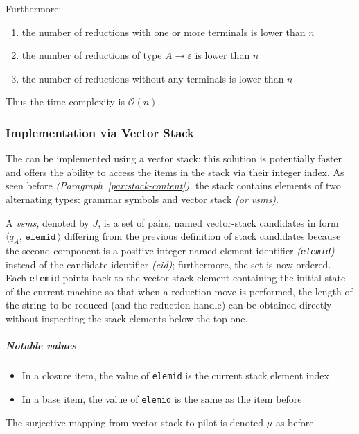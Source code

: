 \documentclass[english]{article}
\begin{document}
Furthermore:
\begin{enumerate}
  \item the number of reductions with one or more terminals is lower than \(n\)
  \item the number of reductions of type \(A \rightarrow \varepsilon\) is lower than \(n\)
  \item the number of reductions without any terminals is lower than \(n\)
\end{enumerate}

Thus the time complexity is \(\mathcal{O}(n)\).

\subsubsection{Implementation via Vector Stack}

The \PDA can be implemented using a vector stack: this solution is potentially faster and offers the ability to access the items in the stack via their integer index.
As seen before \textit{(Paragraph~\ref{par:stack-content})}, the stack contains elements of two alternating types: grammar symbols and vector stack \mstates \textit{(or vsms)}.

A \textit{vsms}, denoted by \(J\), is a set of pairs, named vector-stack candidates in form \(\langle q_A, \, \texttt{elemid} \, \rangle\) differing from the previous definition of stack candidates because the second component is a positive integer named element identifier \textit{(\texttt{elemid})} instead of the candidate identifier \textit{(cid)};
furthermore, the set is now ordered.
Each \texttt{elemid} points back to the vector-stack element containing the initial state of the current machine so that when a reduction move is performed, the length of the string to be reduced (and the reduction handle) can be obtained directly without inspecting the stack elements below the top one.

\subparagraph*{Notable values}

\begin{itemize}
  \item In a closure item, the value of \texttt{elemid} is the current stack element index
  \item In a base item, the value of \texttt{elemid} is the same as the item before
\end{itemize}

\bigskip
The surjective mapping from vector-stack \mstates to pilot \mstates is denoted \(\mu\) as before.
\end{document}
